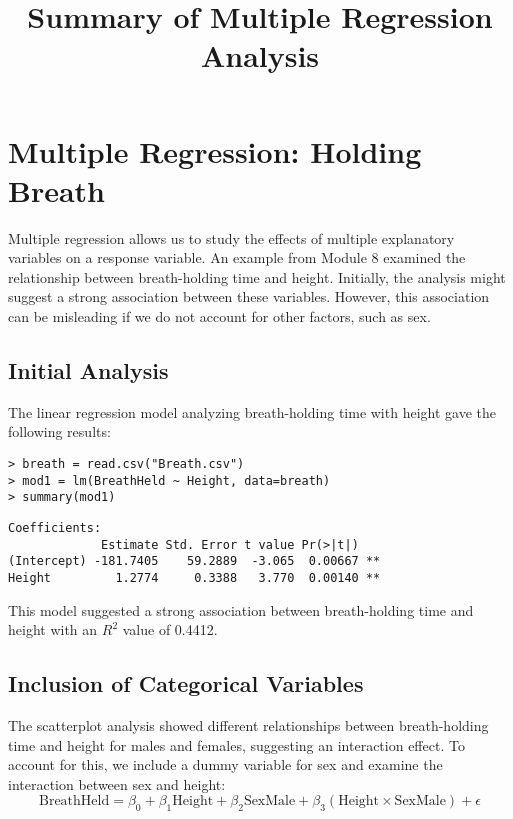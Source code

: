 \documentclass{article}
\begin{document}
\title{Summary of Multiple Regression Analysis}
\author{}
\date{}
\maketitle

\section{Multiple Regression: Holding Breath}

Multiple regression allows us to study the effects of multiple explanatory variables on a response variable. An example from Module 8 examined the relationship between breath-holding time and height. Initially, the analysis might suggest a strong association between these variables. However, this association can be misleading if we do not account for other factors, such as sex.

\subsection{Initial Analysis}

The linear regression model analyzing breath-holding time with height gave the following results:
\begin{verbatim}
> breath = read.csv("Breath.csv")
> mod1 = lm(BreathHeld ~ Height, data=breath)
> summary(mod1)
\end{verbatim}
\begin{verbatim}
Coefficients:
             Estimate Std. Error t value Pr(>|t|)   
(Intercept) -181.7405    59.2889  -3.065  0.00667 **
Height         1.2774     0.3388   3.770  0.00140 **
\end{verbatim}

This model suggested a strong association between breath-holding time and height with an \( R^2 \) value of 0.4412.

\subsection{Inclusion of Categorical Variables}

The scatterplot analysis showed different relationships between breath-holding time and height for males and females, suggesting an interaction effect. To account for this, we include a dummy variable for sex and examine the interaction between sex and height:
\[
\text{BreathHeld} = \beta_0 + \beta_1 \text{Height} + \beta_2 \text{SexMale} + \beta_3 (\text{Height} \times \text{SexMale}) + \epsilon
\]
\end{document}
